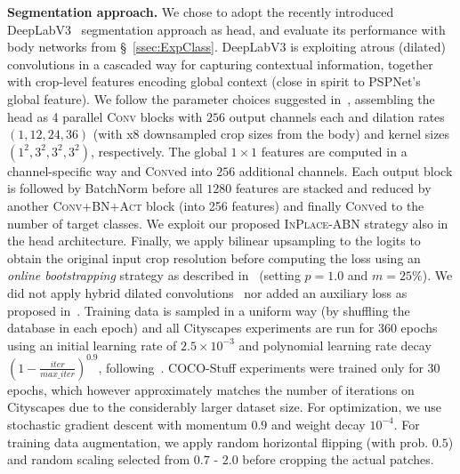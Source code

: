 \documentclass[10pt,twocolumn,letterpaper]{article}
\newcommand{\bnInplace}{\textsc{InPlace-ABN}\xspace}
\newcommand{\myparagraph}[1]{\vspace{5pt}\noindent\textbf{#1}}
\begin{document}
\myparagraph{Segmentation approach.}
We chose to adopt the recently introduced DeepLabV3~\cite{Chen2017} segmentation approach as head, and evaluate its performance with body networks from \S~\ref{ssec:ExpClass}. DeepLabV3 is exploiting atrous (dilated) convolutions in a cascaded way for capturing contextual information, together with crop-level features encoding global context (close in spirit to PSPNet's~\cite{zhao2016pspnet} global feature). We follow the parameter choices suggested in~\cite{Chen2017}, assembling the head as 4 parallel \textsc{Conv} blocks with $256$ output channels each and dilation rates $(1,12,24,36)$ (with x8 downsampled crop sizes from the body) and kernel sizes $(1^2,3^2,3^2,3^2)$, respectively. The global $1\times1$ features are computed in a channel-specific way and \textsc{Conv}ed into $256$ additional channels. Each output block is followed by BatchNorm before all $1280$ features are stacked and reduced by another \textsc{Conv+BN+Act} block (into 256 features) and finally \textsc{Conv}ed to the number of target classes. We exploit our proposed \bnInplace strategy also in the head architecture. Finally, we apply bilinear upsampling to the logits to obtain the original input crop resolution before computing the loss using an \textit{online bootstrapping} strategy as described in~\cite{Wu2016, RotNeuKon17cvpr} (setting $p=1.0$ and $m=25\%$). We did not apply hybrid dilated convolutions~\cite{Wang2017} nor added an auxiliary loss as proposed in~\cite{zhao2016pspnet}. Training data is sampled in a uniform way (by shuffling the database in each epoch) and all Cityscapes experiments are run for 360 epochs using an initial learning rate of $2.5\times 10^{-3}$ and polynomial learning rate decay $(1-\frac{iter}{max\_iter})^{0.9}$, following~\cite{Chen2017}. COCO-Stuff experiments were trained only for 30 epochs, which however approximately matches the number of iterations on Cityscapes due to the considerably larger dataset size. For optimization, we use stochastic gradient descent with momentum $0.9$ and weight decay $10^{-4}$. For training data augmentation, we apply random horizontal flipping (with prob. $0.5$) and random scaling selected from $0.7$ - $2.0$ before cropping the actual patches. 
\end{document}
